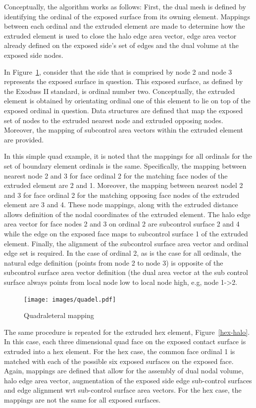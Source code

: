 Conceptually, the algorithm works as follows: First, the dual mesh is defined by identifying
the ordinal of the exposed surface from its owning element. Mappings between each ordinal and the
extruded element are made to determine how the extruded element is used to close the halo edge area vector,
edge area vector already defined on the exposed side's set of edges and the dual volume at the exposed
side nodes.

In Figure~\ref{quad-halo}, consider that the side that is comprised by node 2 and node 3 represents 
the exposed surface in question. This exposed surface, as defined by the Exoduss II standard, is ordinal number two. 
Conceptually, the extruded element is obtained by orientating ordinal one of this element to lie on top of the exposed 
ordinal in question. Data structures are defined that map the exposed set of nodes to the extruded 
nearest node and extruded opposing nodes. Moreover, the mapping of subcontrol area vectors within 
the extruded element are provided.  

In this simple quad example, it is noted that the mappings for all
ordinals for the set of boundary element ordinals is the same. Specifically, the mapping between 
nearest node 2 and 3 for face ordinal 2 for the matching face nodes of the extruded element are 2 and 1. Moreover, the mapping 
between nearest nodel 2 and 3 for face ordinal 2 for the matching opposing face nodes of the extruded
element are 3 and 4. These node mappings, along with the extruded distance allows definition of the nodal coordinates
of the extruded element. The halo edge area vector for face nodes 2 and 3 on ordinal 2 are subcontrol surface 2 and 4 
while the edge on the exposed face maps to subcontrol surface 1 of the extruded element. Finally, the
alignment of the subcontrol surface area vector and ordinal edge set is required. In the case of ordinal 2, as is the
case for all ordinals, the natural edge definition (points from node 2 to node 3) is opposite of the subcontrol
surface area vector definition (the dual area vector at the sub control surface always points from local node low to
local node high, e.g, node 1->2.

\begin{figure}[ht]
\centerline{\texttt{[image: images/quadel.pdf]}}
\vspace{0.1in}
\caption{Quadraleteral mapping}
\label{quad-halo}
\end{figure}

The same procedure is repeated for the extruded hex element, Figure~\ref{hex-halo}.
In this case, each three dimensional quad face on the exposed contact surface is extruded
into a hex element. For the hex case, the common face ordinal 1 is matched with each of the possible
six exposed surfaces on the exposed face. Again, mappings are defined that allow for the 
assembly of dual nodal volume, halo edge area vector, augmentation of the exposed side edge
sub-control surfaces and edge alignment wrt sub-control surface area vectors. For the hex case, the mappings are
not the same for all exposed surfaces.

